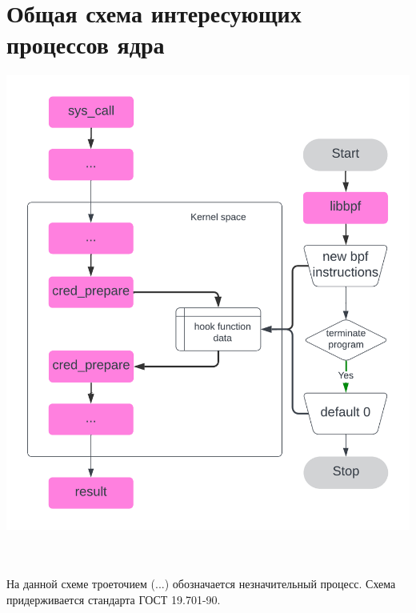 \chapter{Общая схема интересующих процессов ядра}
\label{scheme}

\includegraphics[width=\linewidth]{scheme.png}

\begin{flushleft}
	\ \\
	
	\ \\
	
	На данной схеме троеточием (...) обозначается незначительный процесс. Схема придерживается стандарта ГОСТ 19.701-90.
\end{flushleft}